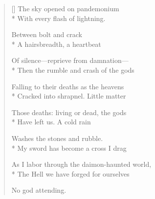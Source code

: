 \label{ch:lear_bc}
\settowidth{\versewidth}{As I labor through the daimon-haunted world,}
\begin{verse}[\versewidth]
 The sky opened on pandemonium\\*
With every flash of lightning.

Between bolt and crack\\*
A hairsbreadth, a heartbeat

Of silence---reprieve from damnation---\\*
Then the rumble and crash of the gods

Falling to their deaths as the heavens\\*
Cracked into shrapnel.   Little matter

Those deaths: living or dead, the gods\\*
Have left us.    A cold rain

Washes the stones and rubble.\\*
My sword has become a cross I drag

As I labor through the daimon-haunted world,\\*
The Hell we have forged for ourselves

No god attending.
\end{verse}
